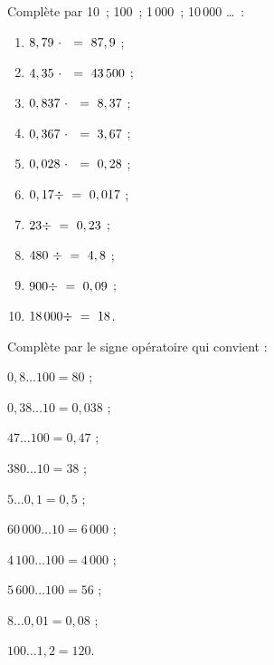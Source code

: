 \begin{exercice}
Complète par 10 ; 100 ; 1\,000 ; 10\,000 \ldots :
\begin{enumerate} 
 \item $8,79 \cdot \dotfill = 87,9$ ; \hspace*{11em}
 
 \item $4,35 \cdot \dotfill = 43\,500$ ; \hspace*{11em}
 
 \item $0,837 \cdot \dotfill = 8,37$ ; \hspace*{11em}
 
 \item $0,367 \cdot \dotfill = 3,67$ ; \hspace*{11em}
 
 \item $0,028 \cdot \dotfill = 0,28$ ; \hspace*{11em}
 
 \item $0,17 \div \dotfill = 0,017$ ; \hspace*{11em}
 
 \item $23 \div \dotfill = 0,23$ ; \hspace*{11em}
 
 \item $480 \div \dotfill = 4,8$ ; \hspace*{11em}
 
 \item $900 \div \dotfill = 0,09$ ; \hspace*{11em}
 
 \item \hspace{0.25em}$18\,000 \div \dotfill = 18$. \hspace*{11em}
 
 \end{enumerate}
\end{exercice}


\begin{exercice}
Complète par le signe opératoire qui convient :
\begin{colenumerate}{2}
 \item $0,8 \ldots 100 = 80$ ;
 \item $0,38 \ldots 10 = 0,038$ ;
 \item $47 \ldots 100 = 0,47$ ;
 \item $380 \ldots 10 = 38$ ;
 \item $5 \ldots 0,1 = 0,5$ ;
 \item $60\,000 \ldots 10 = 6\,000$ ;
 \item $4\,100 \ldots 100 = 4\,000$ ;
 \item $5\,600 \ldots 100 = 56$ ;
 \item $8 \ldots 0,01 = 0,08$ ;
 \item \hspace{0.25em}$100 \ldots 1,2 = 120$.
 \end{colenumerate} 
\end{exercice}


